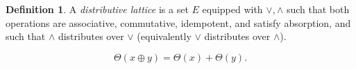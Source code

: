 \documentclass[11pt]{article}
\theoremstyle{definition}
\newtheorem{definition}[theorem]{Definition}
\theoremstyle{remark}
\begin{document}
\begin{definition}
A \emph{distributive lattice} is a set $E$ equipped with $\vee,\wedge$ such that both operations are
associative, commutative, idempotent, and satisfy absorption, and such that $\wedge$ distributes over
$\vee$ (equivalently $\vee$ distributes over $\wedge$).
\end{definition}

\[
  \Theta(x \oplus y) = \Theta(x) + \Theta(y).
\]




\end{document}
